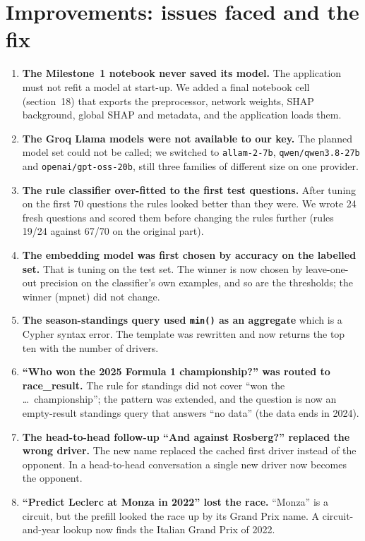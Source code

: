 \documentclass[10pt,a4paper]{article}
\newcommand{\code}[1]{\texttt{#1}}
\begin{document}
\section{Improvements: issues faced and the fix}\label{sec:improve}

\begin{enumerate}[label=(\alph*)]
\item \textbf{The Milestone~1 notebook never saved its model.} The application must not refit a model at start-up. We added a final notebook cell (section~18) that exports the preprocessor, network weights, SHAP background, global SHAP and metadata, and the application loads them.
\item \textbf{The Groq Llama models were not available to our key.} The planned model set could not be called; we switched to \code{allam-2-7b}, \code{qwen/qwen3.8-27b} and \code{openai/gpt-oss-20b}, still three families of different size on one provider.
\item \textbf{The rule classifier over-fitted to the first test questions.} After tuning on the first 70 questions the rules looked better than they were. We wrote 24 fresh questions and scored them before changing the rules further (rules 19/24 against 67/70 on the original part).
\item \textbf{The embedding model was first chosen by accuracy on the labelled set.} That is tuning on the test set. The winner is now chosen by leave-one-out precision on the classifier's own examples, and so are the thresholds; the winner (mpnet) did not change.
\item \textbf{The season-standings query used \code{min()} as an aggregate} which is a Cypher syntax error. The template was rewritten and now returns the top ten with the number of drivers.
\item \textbf{``Who won the 2025 Formula 1 championship?'' was routed to race\_result.} The rule for standings did not cover ``won the \ldots\ championship''; the pattern was extended, and the question is now an empty-result standings query that answers ``no data'' (the data ends in 2024).
\item \textbf{The head-to-head follow-up ``And against Rosberg?'' replaced the wrong driver.} The new name replaced the cached first driver instead of the opponent. In a head-to-head conversation a single new driver now becomes the opponent.
\item \textbf{``Predict Leclerc at Monza in 2022'' lost the race.} ``Monza'' is a circuit, but the prefill looked the race up by its Grand Prix name. A circuit-and-year lookup now finds the Italian Grand Prix of 2022.

\end{enumerate}
\end{document}
